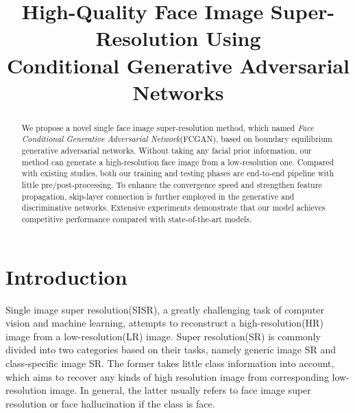 \documentclass[conference,compsoc]{IEEEtran}
\begin{document}
\title{High-Quality Face Image Super-Resolution Using \\ Conditional Generative Adversarial Networks}


\author{
\and
{}

}










\maketitle

\begin{abstract}
We propose a novel single face image super-resolution method, which named \textit{Face Conditional Generative Adversarial Network}(FCGAN), based on boundary equilibrium generative adversarial networks. Without taking any facial prior information, our method can generate a high-resolution face image from a low-resolution one. Compared with existing studies, both our training and testing phases are end-to-end pipeline with little pre/post-processing. To enhance the convergence speed and strengthen feature propagation, skip-layer connection is further employed in the generative and discriminative networks. Extensive experiments demonstrate that our model achieves competitive performance compared with state-of-the-art models.
\end{abstract}



\IEEEpeerreviewmaketitle


\section{Introduction}
Single image super resolution(SISR), a greatly challenging task of computer vision and machine learning, attempts to reconstruct a high-resolution(HR) image from a low-resolution(LR) image. Super resolution(SR) is commonly divided into two categories based on their tasks, namely generic image SR and class-specific image SR. The former takes little class information into account, which aims to recover any kinds of high resolution image from corresponding low-resolution image. In general, the latter usually refers to face image super resolution or face hallucination if the class is face.
\end{document}
